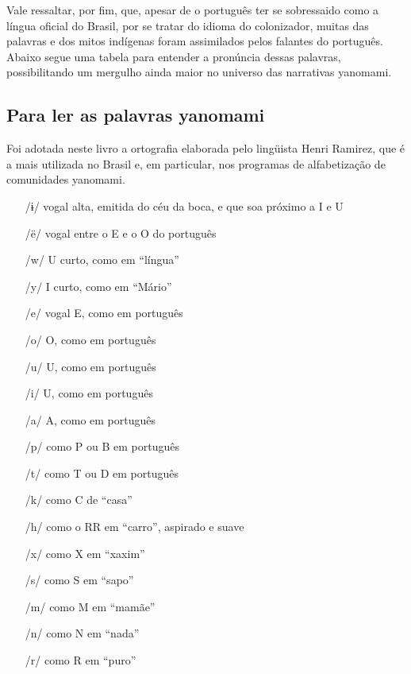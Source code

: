 Vale ressaltar, por fim, que, apesar de o português ter se sobressaido como a língua oficial do Brasil, por se tratar do idioma do colonizador, muitas das palavras e dos mitos indígenas foram assimilados pelos falantes do português.
Abaixo segue uma tabela para entender a pronúncia dessas palavras, possibilitando um mergulho ainda maior no universo das narrativas yanomami.

\subsection{Para ler as palavras yanomami}


Foi adotada neste livro a ortografia elaborada pelo lingüista Henri Ramirez, que é a mais utilizada no Brasil e, em particular, nos programas de alfabetização de comunidades yanomami. 

\begin{itemize}
\item[/ɨ/] vogal alta, emitida do céu da boca, e que soa próximo a I e U
\item[/ë/] vogal entre o E e o O do português
\item[/w/] U curto, como em “língua”
\item[/y/] I curto, como em “Mário”
\item[/e/] vogal E, como em português
\item[/o/] O, como em português
\item[/u/] U, como em português
\item[/i/] U, como em português
\item[/a/] A, como em português
\item[/p/] como P ou B em português
\item[/t/] como T ou D em português
\item[/k/] como C de “casa”
\item[/h/] como o RR em “carro”, aspirado e suave
\item[/x/] como X em “xaxim”
\item[/s/] como S em “sapo”
\item[/m/] como M em “mamãe”
\item[/n/] como N em “nada”
\item[/r/] como R em “puro”
\end{itemize}








 

 

 

 

 

 
